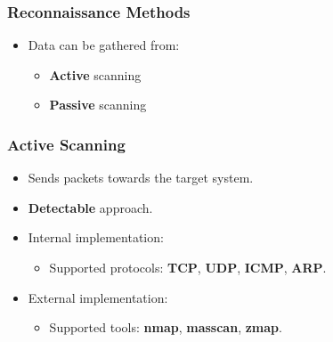 \documentclass[aspectratio=169,xcolor={usenames,dvipsnames}]{beamer}
\newcommand{\ispace}{\vspace{10pt}}
\begin{document}
\begin{frame}
	\frametitle{Reconnaissance Methods}
	
	\begin{itemize}
		\item Data can be gathered from:
		\begin{itemize}
			\item \textbf{Active} scanning
			\item \textbf{Passive} scanning
		\end{itemize}
	\end{itemize}
\end{frame}

\begin{frame}
	\frametitle{Active Scanning}
	
	\begin{itemize}
		\item Sends packets towards the target system.
		\item \textbf{Detectable} approach.
	\end{itemize}
	
	\ispace
	
	\begin{itemize}
		\item Internal implementation:
		\begin{itemize}
			\item Supported protocols: \textbf{TCP}, \textbf{UDP}, \textbf{ICMP}, \textbf{ARP}.
		\end{itemize}
	\end{itemize}
	
	\ispace
	
	\begin{itemize}
		\item External implementation:
		\begin{itemize}
			\item Supported tools: \textbf{nmap}, \textbf{masscan}, \textbf{zmap}.
		\end{itemize}
	\end{itemize}
\end{frame}
\end{document}
